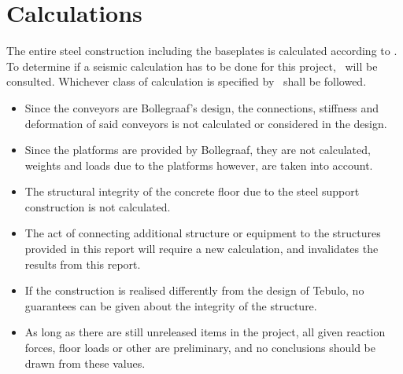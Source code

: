 \section{Calculations}
The entire steel construction including the baseplates is calculated according to \norm .\\
To determine if a seismic calculation has to be done for this project, \norm\ will be consulted. Whichever class of calculation is specified by \norm\ shall be followed.\\
\begin{itemize}

\item	Since the conveyors are Bollegraaf's design, the connections, stiffness and deformation of said conveyors is not calculated or considered in the design.
\item	Since the platforms are provided by Bollegraaf, they are not calculated, weights and loads due to the platforms however, are taken into account.
\item	The structural integrity of the concrete floor due to the steel support construction is not calculated.
\item	The act of connecting additional structure or equipment to the structures provided in this report will require a new calculation, and invalidates the results from this report.
\item	If the construction is realised differently from the design of Tebulo, no guarantees can be given about the integrity of the structure.
\item	As long as there are still unreleased items in the project, all given reaction forces, floor loads or other are preliminary, and no conclusions should be drawn from these values.
\end{itemize}


